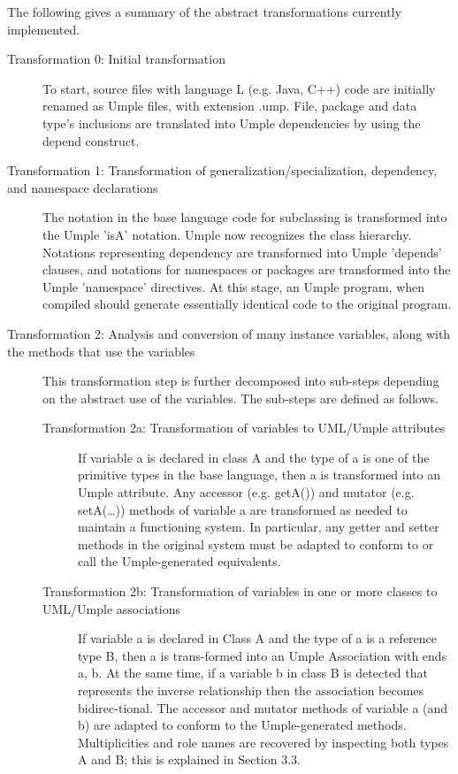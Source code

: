The following gives a summary of the abstract transformations currently implemented.
\begin{description} 
\item[Transformation 0: Initial transformation] 
To start, source files with language L (e.g. Java, C++) code are initially renamed as Umple files, with extension .ump. File, package and data type's inclusions are translated into Umple dependencies by using the depend construct. 
\item [Transformation 1: Transformation of generalization/specialization, dependency, and namespace declarations]
The notation in the base language code for subclassing is transformed into the Umple 'isA' notation. Umple now recognizes the class hierarchy.  Notations representing dependency are transformed into Umple 'depends' clauses, and notations for namespaces or packages are transformed into the Umple 'namespace' directives. At this stage, an Umple program, when compiled should generate essentially identical code to the original program.
\item [Transformation 2: Analysis and conversion of many instance variables, along with the methods that use the variables]
This transformation step is further decomposed into sub-steps depending on the abstract use of the variables. The sub-steps are defined as follows.
   \begin{description}
\item [Transformation 2a: Transformation of variables to UML/Umple attributes]
If variable a is declared in class A and the type of a is one of the primitive types in the base language, then a is transformed into an Umple attribute. Any accessor (e.g. getA()) and mutator (e.g. setA(…)) methods of variable a are transformed as needed to maintain a functioning system. In particular, any getter and setter methods in the original system must be adapted to conform to or call the Umple-generated equivalents.
\item [Transformation 2b: Transformation of variables in one or more classes to UML/Umple associations]
If variable a is declared in Class A and the type of a is a reference type B, then a is trans-formed into an Umple Association with ends {a, b}. At the same time, if a variable b in class B is detected that represents the inverse relationship then the association becomes bidirec-tional. The accessor and mutator methods of variable a (and b) are adapted to conform to the Umple-generated methods. Multiplicities and role names are recovered by inspecting both types A and B; this is explained in Section 3.3. 

\end{description}
\end{description}
